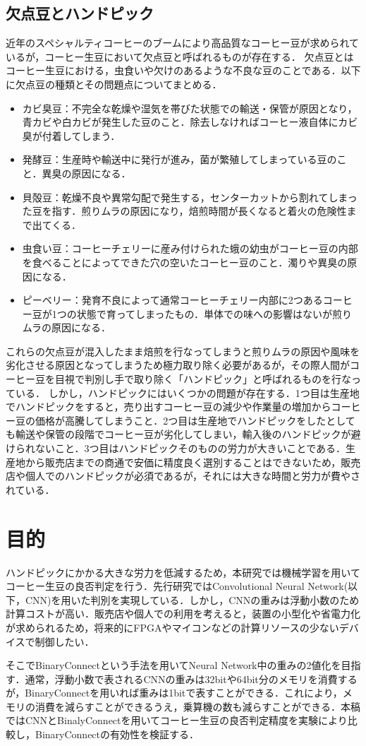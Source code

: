 \subsection{欠点豆とハンドピック}
近年のスペシャルティコーヒーのブームにより高品質なコーヒー豆が求められているが，コーヒー生豆において欠点豆と呼ばれるものが存在する．
欠点豆とはコーヒー生豆における，虫食いや欠けのあるような不良な豆のことである．以下に欠点豆の種類とその問題点についてまとめる．
\begin{itemize}
  \item カビ臭豆：不完全な乾燥や湿気を帯びた状態での輸送・保管が原因となり，青カビや白カビが発生した豆のこと．除去しなければコーヒー液自体にカビ臭が付着してしまう．
  \item 発酵豆：生産時や輸送中に発行が進み，菌が繁殖してしまっている豆のこと．異臭の原因になる．
  \item 貝殻豆：乾燥不良や異常勾配で発生する，センターカットから割れてしまった豆を指す．煎りムラの原因になり，焙煎時間が長くなると着火の危険性まで出てくる．
  \item 虫食い豆：コーヒーチェリーに産み付けられた蛾の幼虫がコーヒー豆の内部を食べることによってできた穴の空いたコーヒー豆のこと．濁りや異臭の原因になる．
  \item ピーベリー：発育不良によって通常コーヒーチェリー内部に2つあるコーヒー豆が1つの状態で育ってしまったもの．単体での味への影響はないが煎りムラの原因になる．
\end{itemize}
これらの欠点豆が混入したまま焙煎を行なってしまうと煎りムラの原因や風味を劣化させる原因となってしまうため極力取り除く必要があるが，その際人間がコーヒー豆を目視で判別し手で取り除く「ハンドピック」と呼ばれるものを行なっている．
しかし，ハンドピックにはいくつかの問題が存在する．1つ目は生産地でハンドピックをすると，売り出すコーヒー豆の減少や作業量の増加からコーヒー豆の価格が高騰してしまうこと．2つ目は生産地でハンドピックをしたとしても輸送や保管の段階でコーヒー豆が劣化してしまい，輸入後のハンドピックが避けられないこと．3つ目はハンドピックそのものの労力が大きいことである．生産地から販売店までの商通で安価に精度良く選別することはできないため，販売店や個人でのハンドピックが必須であるが，それには大きな時間と労力が費やされている．

\section{目的}
ハンドピックにかかる大きな労力を低減するため，本研究では機械学習を用いてコーヒー生豆の良否判定を行う．先行研究ではConvolutional Neural Network(以下，CNN)を用いた判別を実現している．しかし，CNNの重みは浮動小数のため計算コストが高い．販売店や個人での利用を考えると，装置の小型化や省電力化が求められるため，将来的にFPGAやマイコンなどの計算リソースの少ないデバイスで制御したい．

そこでBinaryConnectという手法を用いてNeural Network中の重みの2値化を目指す．通常，浮動小数で表されるCNNの重みは32bitや64bit分のメモリを消費するが，BinaryConnectを用いれば重みは1bitで表すことができる．これにより，メモリの消費を減らすことができるうえ，乗算機の数も減らすことができる．本稿ではCNNとBinalyConnectを用いてコーヒー生豆の良否判定精度を実験により比較し，BinaryConnectの有効性を検証する．
